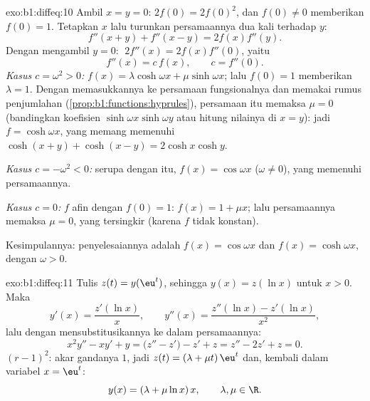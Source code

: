 \begin{solution}{exo:b1:diffeq:10}
Ambil $x = y = 0$: $2f(0) = 2f(0)^2$, dan $f(0) \neq 0$ memberikan $f(0) =
1$. Tetapkan $x$ lalu turunkan persamaannya dua kali terhadap $y$:
\[
f''(x+y) + f''(x-y) = 2 f(x) f''(y) .
\]
Dengan mengambil $y = 0$: $\;2f''(x) = 2 f(x) f''(0)$, yaitu
\[
f''(x) = c\,f(x), \qquad c = f''(0).
\]
\emph{Kasus $c = \omega^2 > 0$:} $f(x) = \lambda\cosh\omega x +
\mu\sinh\omega x$; lalu $f(0) = 1$ memberikan $\lambda = 1$. Dengan memasukkannya ke
persamaan fungsionalnya dan memakai rumus penjumlahan
(\cref{prop:b1:functions:hyprules}), persamaan itu memaksa $\mu = 0$
(bandingkan koefisien $\sinh\omega x \sinh\omega y$ atau
hitung nilainya di $x = y$): jadi $f = \cosh\omega x$, yang memang memenuhi
$\cosh(x+y) + \cosh(x-y) = 2\cosh x\cosh y$.

\emph{Kasus $c = -\omega^2 < 0$:} serupa dengan itu, $f(x) = \cos\omega x$
($\omega \neq 0$), yang memenuhi persamaannya.

\emph{Kasus $c = 0$:} $f$ afin dengan $f(0) = 1$: $f(x) = 1 + \mu x$;
lalu persamaannya memaksa $\mu = 0$, yang tersingkir (karena $f$ tidak konstan).

Kesimpulannya: penyelesaiannya adalah $f(x) = \cos\omega x$ dan $f(x) =
\cosh\omega x$, dengan $\omega > 0$.
\end{solution}

\begin{solution}{exo:b1:diffeq:11}
Tulis $z(t) = y(\eu^t)$, sehingga $y(x) = z(\ln x)$ untuk $x > 0$. Maka
\[
y'(x) = \frac{z'(\ln x)}x,
\qquad
y''(x) = \frac{z''(\ln x) - z'(\ln x)}{x^2} ,
\]
lalu dengan mensubstitusikannya ke dalam persamaannya:
\[
x^2y'' - xy' + y = \bigl(z'' - z'\bigr) - z' + z
= z'' - 2z' + z = 0 .
\]
 $(r - 1)^2$: akar gandanya $1$, jadi $z(t) =
(\lambda + \mu t)\,\eu^t$ dan, kembali dalam variabel $x = \eu^t$:
\[
y(x) = (\lambda + \mu\ln x)\,x,
\qquad \lambda, \mu \in \R .
\]
\end{solution}

